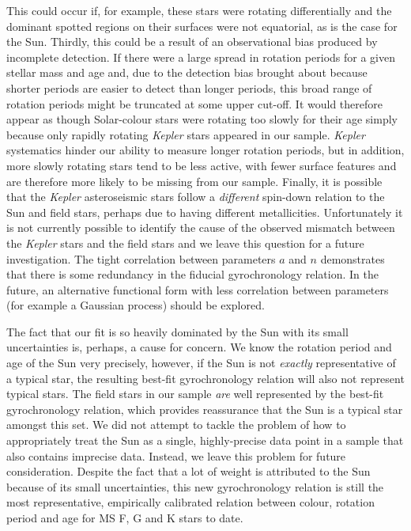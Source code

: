 This could occur if, for example, these stars were rotating differentially
and the dominant spotted regions on their surfaces were not equatorial, as is
the case for the Sun.
Thirdly, this could be a result of an observational bias produced by incomplete
detection.
If there were a large spread in rotation periods for a given stellar mass and
age and, due to the detection bias brought about because shorter periods are
easier to detect than longer periods, this broad range of rotation periods
might be truncated at some upper cut-off.
It would therefore appear as though Solar-colour stars were rotating too
slowly for their age simply because only rapidly rotating {\it Kepler} stars
appeared in our sample.
{\it Kepler} systematics hinder our ability to measure longer rotation periods,
but in addition, more slowly rotating stars tend to be less active, with
fewer surface features and are therefore more likely to be missing from our
sample.
Finally, it is possible that the {\it Kepler} asteroseismic stars follow a
\emph{different} spin-down relation to the Sun and field stars, perhaps due to
having different metallicities. %
Unfortunately it is not currently possible to identify the cause of the
observed mismatch between the {\it Kepler} stars and the field stars and we leave
this question for a future investigation.
The tight correlation between parameters $a$ and $n$ demonstrates that there
is some redundancy in the fiducial gyrochronology relation.
In the future, an alternative functional form with less correlation between
parameters (for example a Gaussian process) should be explored.

The fact that our fit is so heavily dominated by the Sun with its small
uncertainties is, perhaps, a cause for concern.
We know the rotation period and age of the Sun very precisely, however, if the
Sun is not \emph{exactly} representative of a typical star, the resulting
best-fit gyrochronology relation will also not represent typical stars.
The field stars in our sample \emph{are} well represented by the best-fit
gyrochronology relation, which provides reassurance that the Sun is a typical
star amongst this set.
We did not attempt to tackle the problem of how to appropriately treat the Sun
as a single, highly-precise data point in a sample that also contains imprecise
data.
Instead, we leave this problem for future consideration.
Despite the fact that a lot of weight is attributed to the Sun because of its
small uncertainties, this new gyrochronology relation is still the most
representative, empirically calibrated relation between colour, rotation period
and age for MS F, G and K stars to date. %

